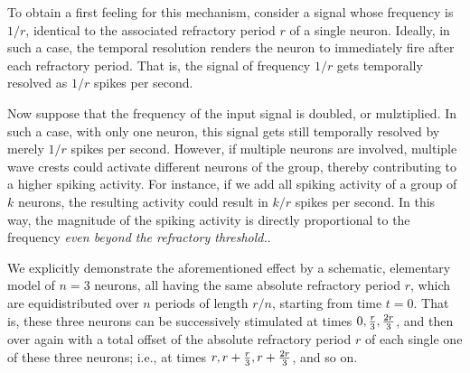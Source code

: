 \documentclass[%
 preprint,
 showpacs,
 showkeys,
 preprintnumbers,
 amsmath,amssymb,
 aps,
 prl,
  longbibliography,
 ]{revtex4-1}
\begin{document}
To obtain a first feeling for this mechanism, consider a signal whose frequency is $1/r$, identical to the associated refractory period $r$ of a single neuron.
Ideally, in such a case, the temporal resolution renders the neuron to immediately fire after each refractory period.
That is,
the signal of frequency $1/r$ gets temporally resolved as $1/r$ spikes per second.

Now suppose that the frequency of the input signal is doubled, or mulztiplied.
In such a case, with only one neuron, this signal gets still temporally resolved by merely $1/r$ spikes per second.
However, if multiple neurons are involved, multiple wave crests could activate different neurons of the group,
thereby contributing to a higher spiking activity.
For instance, if we add all spiking activity of a group of $k$ neurons, the resulting activity could result in
$k/r$ spikes per second.
In this way, the magnitude of the spiking activity is directly proportional to the frequency {\em even beyond the refractory threshold.}.



We explicitly demonstrate the aforementioned effect by a schematic, elementary model of $n=3$ neurons, all having the same
absolute refractory period $r$, which are equidistributed over $n$ periods of
length $r/n$, starting from time $t=0$.
That is, these three neurons can be successively stimulated at times
$
0,
{r\over 3},
{2r\over 3}$,
and then over again with a total offset of the
absolute refractory period $r$ of each single one of these three neurons; i.e., at times
$
r,
r+{r\over 3},
r+{2r\over 3}$, and so on.
\end{document}
